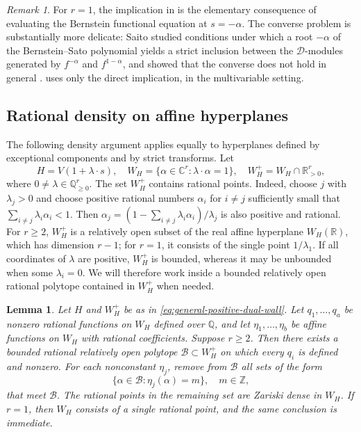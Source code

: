 \documentclass[12pt]{amsart}
\numberwithin{equation}{section}
\theoremstyle{plain}
\newtheorem{lemma}[theorem]{Lemma}
\theoremstyle{definition}
\theoremstyle{remark}
\newtheorem{remark}[theorem]{Remark}
\theoremstyle{definition}
\newcommand{\C}{\mathbb C}
\newcommand{\Q}{\mathbb Q}
\newcommand{\R}{\mathbb R}
\newcommand{\Z}{\mathbb Z}
\newcommand{\D}{\mathscr D}
\begin{document}
\begin{remark}
For $r=1$, the implication in  is the elementary consequence of evaluating the Bernstein functional equation at $s=-\alpha$. The converse problem is substantially more delicate: Saito studied conditions under which a root $-\alpha$ of the Bernstein--Sato polynomial yields a strict inclusion between the $\D$-modules generated by $f^{-\alpha}$ and $f^{1-\alpha}$, and showed that the converse does not hold in general \cite{Saito2021RationalPowers}.  uses only the direct implication, in the multivariable setting.
\end{remark}



\subsection{Rational density on affine hyperplanes}

The following density argument applies equally to hyperplanes defined by exceptional components and by strict transforms. Let
\begin{equation}\label{eq:general-positive-dual-wall}
 H=V(1+\lambda\cdot s), \quad W_H=\{\alpha\in\C^r:\lambda\cdot\alpha=1\}, \quad W_H^+=W_H\cap\R_{>0}^r,
\end{equation}
where $0\neq\lambda\in\Q_{\ge0}^r$. The set $W_H^+$ contains rational points. Indeed, choose $j$ with $\lambda_j>0$ and choose positive rational numbers $\alpha_i$ for $i\neq j$ sufficiently small that $\sum_{i\neq j}\lambda_i\alpha_i<1$. Then $\alpha_j=(1-\sum_{i\neq j}\lambda_i\alpha_i)/\lambda_j
$ is also positive and rational. For $r\ge2$, $W_H^+$ is a relatively open subset of the real affine hyperplane $W_H(\R)$, which has dimension $r-1$; for $r=1$, it consists of the single point $1/\lambda_1$. If all coordinates of $\lambda$ are positive, $W_H^+$ is bounded, whereas it may be unbounded when some $\lambda_i=0$. We will therefore work inside a bounded relatively open rational polytope contained in $W_H^+$ when needed.




\begin{lemma}\label{lem:bounded-polytope-density}
Let $H$ and $W_H^+$ be as in \eqref{eq:general-positive-dual-wall}. Let $q_1,\ldots,q_a$ be nonzero rational functions on $W_H$ defined over $\Q$, and let $\eta_1,\ldots,\eta_b$ be affine functions on $W_H$ with rational coefficients. Suppose $r\ge2$. Then there exists a bounded rational relatively open polytope $\mathcal B\subset W_H^+$ on which every $q_i$ is defined and nonzero. For each nonconstant $\eta_j$, remove from $\mathcal B$ all sets of the form
\begin{equation*}
\{\alpha\in\mathcal B:\eta_j(\alpha)=m\},\quad m\in\Z,
\end{equation*}
that meet $\mathcal B$. The rational points in the remaining set are Zariski dense in $W_H$.
If $r=1$, then $W_H$ consists of a single rational point, and the same conclusion is immediate.
\end{lemma}
\end{document}

